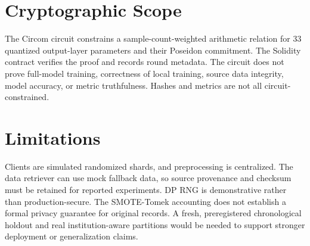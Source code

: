 \documentclass[10pt,conference,letterpaper]{IEEEtran}
\begin{document}
\section{Cryptographic Scope}
The Circom circuit constrains a sample-count-weighted arithmetic relation for 33 quantized output-layer parameters and their Poseidon commitment. The Solidity contract verifies the proof and records round metadata. The circuit does not prove full-model training, correctness of local training, source data integrity, model accuracy, or metric truthfulness. Hashes and metrics are not all circuit-constrained.

\section{Limitations}
Clients are simulated randomized shards, and preprocessing is centralized. The data retriever can use mock fallback data, so source provenance and checksum must be retained for reported experiments. DP RNG is demonstrative rather than production-secure. The SMOTE-Tomek accounting does not establish a formal privacy guarantee for original records. A fresh, preregistered chronological holdout and real institution-aware partitions would be needed to support stronger deployment or generalization claims.
\end{document}
